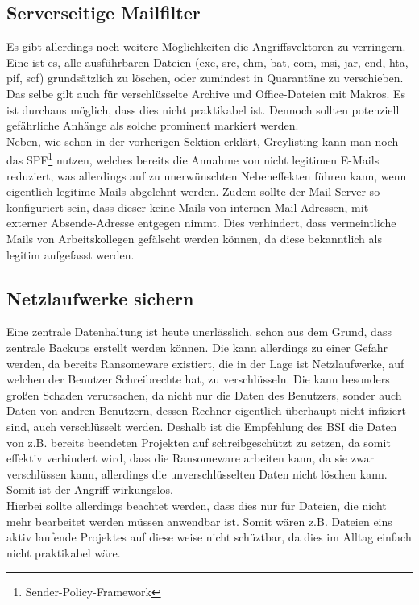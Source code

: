 \subsection{Serverseitige Mailfilter}

	Es gibt allerdings noch weitere Möglichkeiten die Angriffsvektoren zu verringern. Eine ist es, alle ausführbaren Dateien (exe, src, chm, bat, com, msi, jar, cnd, hta, pif, scf) grundsätzlich zu löschen, oder zumindest in Quarantäne zu verschieben.\cite{bsi:ransome}\\
	Das selbe gilt auch für verschlüsselte Archive und Office-Dateien mit Makros. Es ist durchaus möglich, dass dies nicht praktikabel ist. Dennoch sollten potenziell gefährliche Anhänge als solche prominent markiert werden.\cite{bsi:ransome}\\
	Neben, wie schon in der vorherigen Sektion erklärt, Greylisting kann man noch das SPF\footnote{Sender-Policy-Framework} nutzen, welches bereits die Annahme von nicht legitimen E-Mails reduziert, was allerdings auf zu unerwünschten Nebeneffekten führen kann, wenn eigentlich legitime Mails abgelehnt werden. Zudem sollte der Mail-Server so konfiguriert sein, dass dieser keine Mails von internen Mail-Adressen, mit externer Absende-Adresse entgegen nimmt.\cite{bsi:ransome} Dies verhindert, dass vermeintliche Mails von  Arbeitskollegen gefälscht werden können, da diese bekanntlich als legitim aufgefasst werden.
	
	
\subsection{Netzlaufwerke sichern}

	Eine zentrale Datenhaltung ist heute unerlässlich, schon aus dem Grund, dass zentrale Backups erstellt werden können. Die kann allerdings zu einer Gefahr werden, da bereits Ransomeware existiert, die in der Lage ist Netzlaufwerke, auf welchen der Benutzer Schreibrechte hat, zu verschlüsseln. Die kann besonders großen Schaden verursachen, da nicht nur die Daten des Benutzers, sonder auch Daten von andren Benutzern, dessen Rechner eigentlich überhaupt nicht infiziert sind, auch verschlüsselt werden. Deshalb ist die Empfehlung des BSI die Daten von z.B. bereits beendeten Projekten auf schreibgeschützt zu setzen, da somit effektiv verhindert wird, dass die Ransomeware arbeiten kann, da sie zwar verschlüssen kann, allerdings die unverschlüsselten Daten nicht löschen kann. Somit ist der Angriff wirkungslos. \cite{bsi:ransome}\\
	Hierbei sollte allerdings beachtet werden, dass dies nur für Dateien, die nicht mehr bearbeitet werden müssen anwendbar ist. Somit wären z.B. Dateien eins aktiv laufende Projektes auf diese weise nicht schüztbar, da dies im Alltag einfach nicht praktikabel wäre.
	
